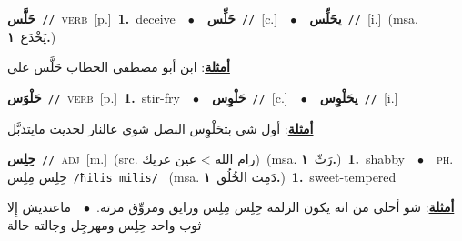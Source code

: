 \documentclass[10pt,a4paper,twoside]{article} %
\begin{document}
\begin{multicols}{2}
{\setlength\topsep{0pt}\textbf{\foreignlanguage{arabic}{حَلَّس}}\ {\color{gray}\texttt{//}\color{black}}\ \textsc{verb}\ [p.]\ \textbf{1.}~deceive\ \ $\bullet$\ \ \setlength\topsep{0pt}\textbf{\foreignlanguage{arabic}{حَلِّس}}\ {\color{gray}\texttt{//}\color{black}}\ [c.]\ \ $\bullet$\ \ \setlength\topsep{0pt}\textbf{\foreignlanguage{arabic}{يحَلِّس}}\ {\color{gray}\texttt{//}\color{black}}\ [i.]\ \color{gray}(msa. \foreignlanguage{arabic}{يَخْدَع}~\foreignlanguage{arabic}{\textbf{١.}})\color{black}\  \begin{flushright}\color{gray}\foreignlanguage{arabic}{\textbf{\underline{\foreignlanguage{arabic}{أمثلة}}}: ابن أبو مصطفى الحطاب حَلَّس على}\end{flushright}\color{black}} \vspace{2mm}

{\setlength\topsep{0pt}\textbf{\foreignlanguage{arabic}{حَلْوَس}}\ {\color{gray}\texttt{//}\color{black}}\ \textsc{verb}\ [p.]\ \textbf{1.}~stir-fry\ \ $\bullet$\ \ \setlength\topsep{0pt}\textbf{\foreignlanguage{arabic}{حَلْوِس}}\ {\color{gray}\texttt{//}\color{black}}\ [c.]\ \ $\bullet$\ \ \setlength\topsep{0pt}\textbf{\foreignlanguage{arabic}{يحَلْوِس}}\ {\color{gray}\texttt{//}\color{black}}\ [i.]\  \begin{flushright}\color{gray}\foreignlanguage{arabic}{\textbf{\underline{\foreignlanguage{arabic}{أمثلة}}}: أول شي بتحَلْوِس البصل شوي عالنار لحديت مايتذبَّل}\end{flushright}\color{black}} \vspace{2mm}

{\setlength\topsep{0pt}\textbf{\foreignlanguage{arabic}{حِلِس}}\ {\color{gray}\texttt{//}\color{black}}\ \textsc{adj}\ [m.]\ (src. \color{gray}\foreignlanguage{arabic}{رام الله > عين عريك}\color{black})\ \color{gray}(msa. \foreignlanguage{arabic}{رَثّ}~\foreignlanguage{arabic}{\textbf{١.}})\color{black}\ \textbf{1.}~shabby\ \ $\bullet$\ \ \textsc{ph.} \color{gray} \foreignlanguage{arabic}{حِلِس مِلِس}\color{black}\ {\color{gray}\texttt{/{\sffamily ħilis milis}/}\color{black}}\ \color{gray} (msa. \foreignlanguage{arabic}{دَمِث الخُلُق}~\foreignlanguage{arabic}{\textbf{١.}})\color{black}\ \textbf{1.}~sweet-tempered\  \begin{flushright}\color{gray}\foreignlanguage{arabic}{\textbf{\underline{\foreignlanguage{arabic}{أمثلة}}}: شو أحلى من انه يكون الزلمة حِلِس مِلِس ورايق ومروِّق مرته.\ $\bullet$\ \  ماعنديش إِلا ثوب واحد حِلِس ومهرجِل وجالته حالة}\end{flushright}\color{black}} \vspace{2mm}


\end{multicols}
\end{document}
